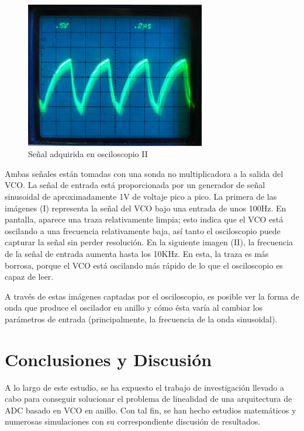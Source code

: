 \documentclass[12pt]{report} %
\begin{document}
	\begin{figure}[H]
		\includegraphics[width=0.7\textwidth]{proto-osc-blurry-cropped.png}
		\caption[Señal adquirida en osciloscopio II]{Señal adquirida en osciloscopio II}
		\label{fig:proto-osc-blurry-png.png}
	\end{figure}

	Ambas señales están tomadas con una sonda no multiplicadora a la salida del VCO. La señal de entrada está proporcionada por un generador de señal sinusoidal de aproximadamente 1V de voltaje pico a pico. La primera de las imágenes (I) representa la señal del VCO bajo una entrada de unos 100Hz. En pantalla, aparece una traza relativamente limpia; esto indica que el VCO está oscilando a una frecuencia relativamente baja, así tanto el osciloscopio puede capturar la señal sin perder resolución. En la siguiente imagen (II), la frecuencia de la señal de entrada aumenta hasta los 10KHz. En esta, la traza es más borrosa, porque el VCO está oscilando más rápido de lo que el osciloscopio es capaz de leer.
	
	A través de estas imágenes captadas por el osciloscopio, es posible ver la forma de onda que produce el oscilador en anillo y cómo ésta varía al cambiar los parámetros de entrada (principalmente, la frecuencia de la onda sinusoidal).
	
\chapter{Conclusiones y Discusión}

	A lo largo de este estudio, se ha expuesto el trabajo de investigación llevado a cabo para conseguir solucionar el problema de linealidad de una arquitectura de ADC basado en VCO en anillo. Con tal fin, se han hecho estudios matemáticos y numerosas simulaciones con su correspondiente discusión de resultados.
	
\end{document}
